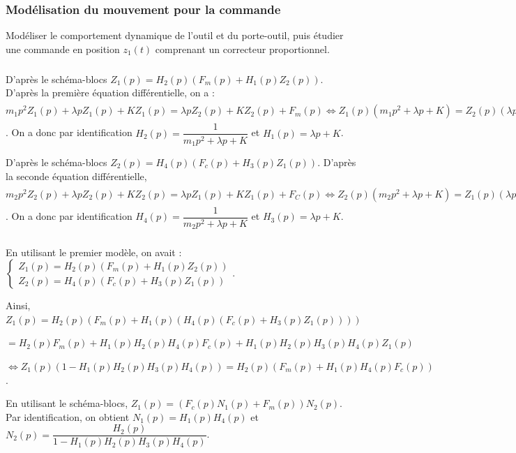 \documentclass[10pt,fleqn]{article} %
\begin{document}
\subsubsection{Modélisation du mouvement pour la commande}

\begin{obj}
Modéliser le comportement dynamique de l’outil et du porte-outil, puis étudier une commande  en position $z_1(t)$ comprenant un correcteur proportionnel.
\end{obj}

\subparagraph{}

D'après le schéma-blocs $Z_1(p)=H_2(p)\left(F_m(p)+H_1(p)Z_2(p)\right)$. 
D'après la première équation différentielle, on a : $m_1p^2 Z_1(p) + \lambda pZ_1(p)+KZ_1(p)=\lambda pZ_2(p)+KZ_2(p)+F_m(p)\Leftrightarrow 
Z_1(p)\left(m_1p^2  + \lambda p+K \right)=Z_2(p)\left(\lambda p+K\right)+F_m(p)
\Leftrightarrow 
Z_1(p)= \dfrac{Z_2(p)\left(\lambda p+K\right)+F_m(p)}{m_1p^2  + \lambda p+K}$.
On a donc par identification $H_2(p)=\dfrac{1}{m_1p^2  + \lambda p+K}$ et $H_1(p)=\lambda p+K$.

D'après le schéma-blocs $Z_2(p)=H_4(p)\left(F_c(p)+H_3(p)Z_1(p)\right)$. D'après la seconde équation différentielle,  $m_2p^2 Z_2(p) + \lambda pZ_2(p)+KZ_2(p)=\lambda pZ_1(p)+KZ_1(p)+F_C(p)\Leftrightarrow Z_2(p)\left( m_2p^2  + \lambda p+K \right)=Z_1(p)\left(\lambda p+K\right)+F_C(p)\Leftrightarrow Z_2(p)=\dfrac{Z_1(p)\left(\lambda p+K\right)+F_C(p)}{ m_2p^2  + \lambda p+K}$.
On a donc par identification $H_4(p)=\dfrac{1}{m_2p^2  + \lambda p+K}$ et $H_3(p)=\lambda p+K$.



\subparagraph{}
En utilisant le premier modèle, on avait :
$
\left\{\begin{array}{l}
Z_1(p)=H_2(p)\left(F_m(p)+H_1(p)Z_2(p)\right) \\
Z_2(p)=H_4(p)\left(F_c(p)+H_3(p)Z_1(p)\right)
\end{array}
\right.
$. 

Ainsi, $Z_1(p)=H_2(p)\left(F_m(p)+H_1(p)\left( H_4(p)\left(F_c(p)+H_3(p)Z_1(p)\right)\right)\right) $

$=H_2(p)F_m(p)+H_1(p)H_2(p) H_4(p)F_c(p)+H_1(p)H_2(p) H_3(p)H_4(p)Z_1(p) $

$\Leftrightarrow Z_1(p)\left( 1-H_1(p)H_2(p) H_3(p)H_4(p)\right)=H_2(p)\left(F_m(p)+H_1(p)H_4(p)F_c(p)\right) $. 

En utilisant le schéma-blocs, $Z_1(p)=\left(F_c(p)N_1(p)+F_m(p)\right)N_2(p)$. 
Par identification, on obtient $N_1(p)=H_1(p)H_4(p)$ et $N_2(p)=\dfrac{H_2(p)}{1-H_1(p)H_2(p) H_3(p)H_4(p)}$.
\end{document}
